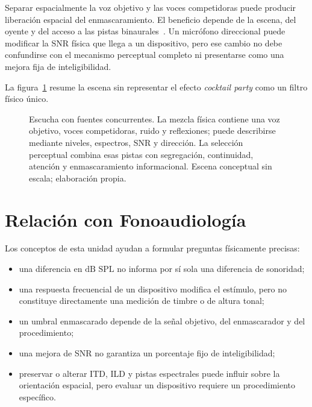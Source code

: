 Separar espacialmente la voz objetivo y las voces competidoras puede
producir liberación espacial del enmascaramiento. El beneficio depende de la
escena, del oyente y del acceso a las pistas binaurales~\cite{bronkhorst2000}. Un micrófono
direccional puede modificar la SNR física que llega a un dispositivo, pero ese
cambio no debe confundirse con el mecanismo perceptual completo ni presentarse
como una mejora fija de inteligibilidad.

La figura~\ref{fig:u7-fuentes-concurrentes} resume la escena sin representar el
efecto \emph{cocktail party} como un filtro físico único.

\begin{figure}[htbp]
    \centering
    
    \caption{Escucha con fuentes concurrentes. La mezcla física contiene una
    voz objetivo, voces competidoras, ruido y reflexiones; puede describirse
    mediante niveles, espectros, SNR y dirección. La selección perceptual
    combina esas pistas con segregación, continuidad, atención y
    enmascaramiento informacional. Escena conceptual sin escala; elaboración
    propia.}
    \label{fig:u7-fuentes-concurrentes}
\end{figure}
\section{Relación con Fonoaudiología}
\label{sec:u7-relacion-fonoaudiologia}

Los conceptos de esta unidad ayudan a formular preguntas físicamente
precisas:

\begin{itemize}
    \item una diferencia en \(\text{dB SPL}\) no informa por sí sola una
    diferencia de sonoridad;
    \item una respuesta frecuencial de un dispositivo modifica el estímulo,
    pero no constituye directamente una medición de timbre o de altura tonal;
    \item un umbral enmascarado depende de la señal objetivo, del enmascarador
    y del procedimiento;
    \item una mejora de SNR no garantiza un porcentaje fijo de
    inteligibilidad;
    \item preservar o alterar ITD, ILD y pistas espectrales puede influir sobre
    la orientación espacial, pero evaluar un dispositivo requiere un
    procedimiento específico.
\end{itemize}

